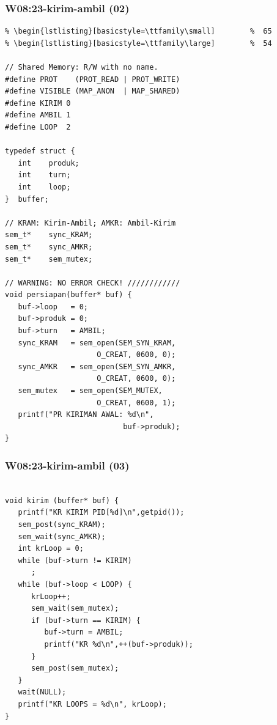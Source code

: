\documentclass[aspectratio=169, xcolor=table, notheorems, hyperref={pdfpagelabels=false}]{beamer}
\begin{document}
\begin{frame}[fragile]
\frametitle{W08:23-kirim-ambil (02)}
\begin{lstlisting}[basicstyle=\ttfamily\tiny]         % 108
% \begin{lstlisting}[basicstyle=\ttfamily\footnotesize] %  72
% \begin{lstlisting}[basicstyle=\ttfamily\small]        %  65
% \begin{lstlisting}[basicstyle=\ttfamily\large]        %  54

// Shared Memory: R/W with no name.
#define PROT    (PROT_READ | PROT_WRITE)
#define VISIBLE (MAP_ANON  | MAP_SHARED)
#define KIRIM 0
#define AMBIL 1
#define LOOP  2

typedef struct {
   int    produk;
   int    turn;
   int    loop;
}  buffer;

// KRAM: Kirim-Ambil; AMKR: Ambil-Kirim
sem_t*    sync_KRAM;
sem_t*    sync_AMKR;
sem_t*    sem_mutex;

// WARNING: NO ERROR CHECK! ////////////
void persiapan(buffer* buf) {
   buf->loop   = 0;
   buf->produk = 0;
   buf->turn   = AMBIL;
   sync_KRAM   = sem_open(SEM_SYN_KRAM, 
                     O_CREAT, 0600, 0);
   sync_AMKR   = sem_open(SEM_SYN_AMKR, 
                     O_CREAT, 0600, 0);
   sem_mutex   = sem_open(SEM_MUTEX, 
                     O_CREAT, 0600, 1);
   printf("PR KIRIMAN AWAL: %d\n",
                           buf->produk);
}

\end{lstlisting}
\end{frame}

\begin{frame}[fragile]
\frametitle{W08:23-kirim-ambil (03)}
\begin{lstlisting}[basicstyle=\ttfamily\small]        %  65
% \begin{lstlisting}[basicstyle=\ttfamily\large]        %  54

void kirim (buffer* buf) {
   printf("KR KIRIM PID[%d]\n",getpid());
   sem_post(sync_KRAM);
   sem_wait(sync_AMKR);
   int krLoop = 0;
   while (buf->turn != KIRIM)
      ;
   while (buf->loop < LOOP) {
      krLoop++;
      sem_wait(sem_mutex);
      if (buf->turn == KIRIM) {
         buf->turn = AMBIL;
         printf("KR %d\n",++(buf->produk));
      }
      sem_post(sem_mutex);
   }
   wait(NULL);
   printf("KR LOOPS = %d\n", krLoop);
}

\end{lstlisting}
\end{frame}
\end{document}
